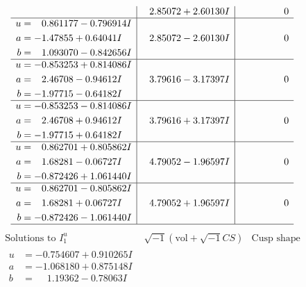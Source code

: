 \documentclass[1p]{elsarticle_modified}
\theoremstyle{definition}
\newcommand{\I}{\sqrt{-1}}
\begin{document}
$$\begin{array}{c|c|c}
 & \phantom{-}2.85072 + 2.60130 I & \phantom{-0.000000 } 0 \\ \hline\begin{aligned}
u &= \phantom{-}0.861177 - 0.796914 I \\
a &= -1.47855 + 0.64041 I \\
b &= \phantom{-}1.093070 - 0.842656 I\end{aligned}
 & \phantom{-}2.85072 - 2.60130 I & \phantom{-0.000000 } 0 \\ \hline\begin{aligned}
u &= -0.853253 + 0.814086 I \\
a &= \phantom{-}2.46708 - 0.94612 I \\
b &= -1.97715 - 0.64182 I\end{aligned}
 & \phantom{-}3.79616 - 3.17397 I & \phantom{-0.000000 } 0 \\ \hline\begin{aligned}
u &= -0.853253 - 0.814086 I \\
a &= \phantom{-}2.46708 + 0.94612 I \\
b &= -1.97715 + 0.64182 I\end{aligned}
 & \phantom{-}3.79616 + 3.17397 I & \phantom{-0.000000 } 0 \\ \hline\begin{aligned}
u &= \phantom{-}0.862701 + 0.805862 I \\
a &= \phantom{-}1.68281 - 0.06727 I \\
b &= -0.872426 + 1.061440 I\end{aligned}
 & \phantom{-}4.79052 - 1.96597 I & \phantom{-0.000000 } 0 \\ \hline\begin{aligned}
u &= \phantom{-}0.862701 - 0.805862 I \\
a &= \phantom{-}1.68281 + 0.06727 I \\
b &= -0.872426 - 1.061440 I\end{aligned}
 & \phantom{-}4.79052 + 1.96597 I & \phantom{-0.000000 } 0\\
 \hline 
 \end{array}$$\newpage$$\begin{array}{c|c|c}  
\text{Solutions to }I^u_{1}& \I (\text{vol} + \sqrt{-1}CS) & \text{Cusp shape}\\
 \hline 
\begin{aligned}
u &= -0.754607 + 0.910265 I \\
a &= -1.068180 + 0.875148 I \\
b &= \phantom{-}1.19362 - 0.78063 I\end{aligned}

\end{array}$$
\end{document}
